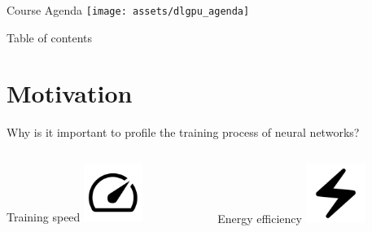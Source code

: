 \documentclass[compress,aspectratio=169]{beamer}
\title{\Large \mytitle}
\date{\mydate}
\subtitle{\mysubtitle}
\author{{\myauthor}}
\institute{\myinstitute}
\begin{document}
\begin{frame}[plain]
	\titlepage
\end{frame}

\begin{frame}{Course Agenda}
\centering
\texttt{[image: assets/dlgpu\_agenda]}
\end{frame}

\begin{frame}[t]{Table of contents}
  \tableofcontents[subsectionstyle=hide/hide]
\end{frame}


\section{Motivation}

\begin{frame}{Why is it important to profile the training process of neural networks?}

    \begin{columns}
        \begin{column}{0.5\textwidth}
            \begin{block}{\centering Training speed}
                \centering
                \vspace{3em}
                \includegraphics[width=0.3\textwidth]{assets/speed_FILL0_wght400_GRAD0_opsz48.png}
            \end{block}
        \end{column}
        \begin{column}{0.5\textwidth}
            \begin{block}{\centering Energy efficiency}
                \centering
                \vspace{3em}
                \includegraphics[width=0.3\textwidth]{assets/electric_bolt_FILL0_wght400_GRAD0_opsz48}
            \end{block}
        \end{column}
    \end{columns}

\end{frame}
\end{document}
